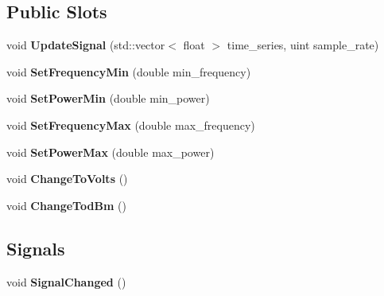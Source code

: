 \subsection*{Public Slots}
\begin{DoxyCompactItemize}
\item 
\hypertarget{class_spectrum_analyzer_aa1979b784bdb752d6f635c4cecb9a4b6}{void {\bfseries Update\+Signal} (std\+::vector$<$ float $>$ time\+\_\+series, uint sample\+\_\+rate)}\label{class_spectrum_analyzer_aa1979b784bdb752d6f635c4cecb9a4b6}

\item 
\hypertarget{class_spectrum_analyzer_a442e34f2e52a974bc33d614c4714a9e3}{void {\bfseries Set\+Frequency\+Min} (double min\+\_\+frequency)}\label{class_spectrum_analyzer_a442e34f2e52a974bc33d614c4714a9e3}

\item 
\hypertarget{class_spectrum_analyzer_aeb522d65cc87a8491f2480b3ec1cf133}{void {\bfseries Set\+Power\+Min} (double min\+\_\+power)}\label{class_spectrum_analyzer_aeb522d65cc87a8491f2480b3ec1cf133}

\item 
\hypertarget{class_spectrum_analyzer_ad1d9bf78ce633b097641ee092645daae}{void {\bfseries Set\+Frequency\+Max} (double max\+\_\+frequency)}\label{class_spectrum_analyzer_ad1d9bf78ce633b097641ee092645daae}

\item 
\hypertarget{class_spectrum_analyzer_adcaf09fb5f0449b6dd95b97e2469af47}{void {\bfseries Set\+Power\+Max} (double max\+\_\+power)}\label{class_spectrum_analyzer_adcaf09fb5f0449b6dd95b97e2469af47}

\item 
\hypertarget{class_spectrum_analyzer_a7edc26864d46ebddd34257ff0d6bc8b7}{void {\bfseries Change\+To\+Volts} ()}\label{class_spectrum_analyzer_a7edc26864d46ebddd34257ff0d6bc8b7}

\item 
\hypertarget{class_spectrum_analyzer_af8f497cd56535515bc17319236fb0524}{void {\bfseries Change\+Tod\+Bm} ()}\label{class_spectrum_analyzer_af8f497cd56535515bc17319236fb0524}

\end{DoxyCompactItemize}
\subsection*{Signals}
\begin{DoxyCompactItemize}
\item 
\hypertarget{class_spectrum_analyzer_afcbb7dc1848df0eb7d43160e489b8855}{void {\bfseries Signal\+Changed} ()}\label{class_spectrum_analyzer_afcbb7dc1848df0eb7d43160e489b8855}

\end{DoxyCompactItemize}
